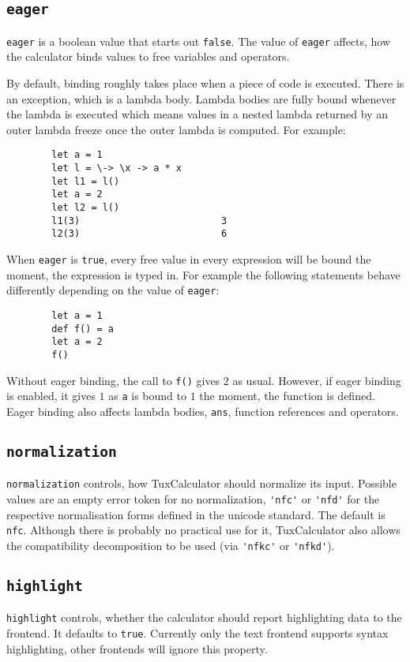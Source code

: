 \documentclass[10pt]{article}
\begin{document}
    \subsection{\texttt{eager}}\label{subsec:eager}
    \verb|eager| is a boolean value that starts out \verb|false|.
    The value of \verb|eager| affects, how the calculator binds values to free variables and operators.
    
    By default, binding roughly takes place when a piece of code is executed.
    There is an exception, which is a lambda body.
    Lambda bodies are fully bound whenever the lambda is executed which means values in a nested lambda returned by an outer lambda freeze once the outer lambda is computed.
    For example:
    \begin{verbatim}
        let a = 1
        let l = \-> \x -> a * x
        let l1 = l()
        let a = 2
        let l2 = l()
        l1(3)                         3
        l2(3)                         6
    \end{verbatim}
    When \verb|eager| is \verb|true|, every free value in every expression will be bound the moment, the expression is typed in.
    For example the following statements behave differently depending on the value of \verb|eager|:
    \begin{verbatim}
        let a = 1
        def f() = a
        let a = 2
        f()
    \end{verbatim}
    Without eager binding, the call to \verb|f()| gives $ 2 $ as usual.
    However, if eager binding is enabled, it gives $ 1 $ as \verb|a| is bound to $ 1 $ the moment, the function is defined.
    Eager binding also affects lambda bodies, \verb|ans|, function references and operators.
    
    \subsection{\texttt{normalization}}\label{subsec:normalization}
    \verb|normalization| controls, how TuxCalculator should normalize its input.
    Possible values are an empty error token for no normalization, \verb|'nfc'| or \verb|'nfd'| for the respective normalisation forms defined in the unicode standard.
    The default is \verb|nfc|.
    Although there is probably no practical use for it, TuxCalculator also allows the compatibility decomposition to be used (via \verb|'nfkc'| or \verb|'nfkd'|).
    
    \subsection{\texttt{highlight}}\label{subsec:highlight}
    \verb|highlight| controls, whether the calculator should report highlighting data to the frontend.
    It defaults to \verb|true|.
    Currently only the text frontend supports syntax highlighting, other frontends will ignore this property.
    
\end{document}
